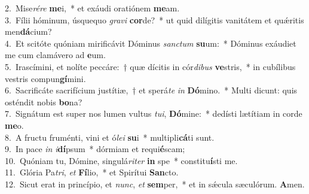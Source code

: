 {2.~}Mise\textit{ré}\textit{re} \textbf{me}i,~* et exáudi oratiónem \textbf{me}am.\\
{3.~}Fílii hóminum, úsquequo \textit{gra}\textit{vi} \textbf{cor}de?~* ut quid dilígitis vanitátem et quǽritis men\textbf{dá}cium?\\
{4.~}Et scitóte quóniam mirificávit Dóminus \textit{san}\textit{ctum} \textbf{su}um:~* Dóminus exáudiet me cum clamávero ad \textbf{e}um.\\
{5.~}Irascímini, et nolíte peccáre:~† quæ dícitis in cór\textit{di}\textit{bus} \textbf{ve}stris,~* in cubílibus vestris compun\textbf{gí}mini.\\
{6.~}Sacrificáte sacrifícium justítiæ,~† et sperá\textit{te} \textit{in} \textbf{Dó}mino.~* Multi dicunt: quis osténdit nobis \textbf{bo}na?\\
{7.~}Signátum est super nos lumen vultus \textit{tu}\textit{i}, \textbf{Dó}mine:~* dedísti lætítiam in corde \textbf{me}o.\\
{8.~}A fructu fruménti, vini et ó\textit{le}\textit{i} \textbf{su}i~* multipli\textbf{cá}ti sunt.\\
{9.~}In pace \textit{in} \textit{i}\textbf{dí}psum~* dórmiam et requi\textbf{é}scam;\\
{10.~}Quóniam tu, Dómine, singulá\textit{ri}\textit{ter} \textbf{in} spe~* constitu\textbf{í}sti me.\\
{11.~}Glória Pa\textit{tri}, \textit{et} \textbf{Fí}lio,~* et Spirítui \textbf{San}cto.\\
{12.~}Sicut erat in princípio, et \textit{nunc}, \textit{et} \textbf{sem}per,~* et in sǽcula sæculórum. \textbf{A}men.\\
